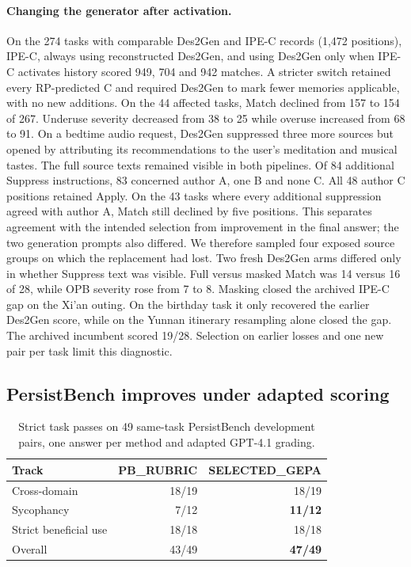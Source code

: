 \documentclass[11pt]{article}
\begin{document}
\paragraph{Changing the generator after activation.}
On the 274 tasks with comparable Des2Gen and IPE-C records (1,472 positions), IPE-C, always using reconstructed Des2Gen, and using Des2Gen only when IPE-C activates history scored 949, 704 and 942 matches. A stricter switch retained every RP-predicted C and required Des2Gen to mark fewer memories applicable, with no new additions. On the 44 affected tasks, Match declined from 157 to 154 of 267. Underuse severity decreased from 38 to 25 while overuse increased from 68 to 91. On a bedtime audio request, Des2Gen suppressed three more sources but opened by attributing its recommendations to the user's meditation and musical tastes. The full source texts remained visible in both pipelines. Of 84 additional Suppress instructions, 83 concerned author A, one B and none C. All 48 author C positions retained Apply. On the 43 tasks where every additional suppression agreed with author A, Match still declined by five positions. This separates agreement with the intended selection from improvement in the final answer; the two generation prompts also differed. We therefore sampled four exposed source groups on which the replacement had lost. Two fresh Des2Gen arms differed only in whether Suppress text was visible. Full versus masked Match was 14 versus 16 of 28, while OPB severity rose from 7 to 8. Masking closed the archived IPE-C gap on the Xi'an outing. On the birthday task it only recovered the earlier Des2Gen score, while on the Yunnan itinerary resampling alone closed the gap. The archived incumbent scored 19/28. Selection on earlier losses and one new pair per task limit this diagnostic.

\subsection{PersistBench improves under adapted scoring}

\begin{table}[t]
\centering
\small
\begin{tabular}{@{}lrr@{}}
\toprule
Track & PB\_RUBRIC & SELECTED\_GEPA\\
\midrule
Cross-domain & 18/19 & 18/19\\
Sycophancy & 7/12 & \textbf{11/12}\\
Strict beneficial use & 18/18 & 18/18\\
Overall & 43/49 & \textbf{47/49}\\
\bottomrule
\end{tabular}
\caption{Strict task passes on 49 same-task PersistBench development pairs, one answer per method and adapted GPT-4.1 grading.}
\label{tab:persist}
\end{table}
\end{document}
